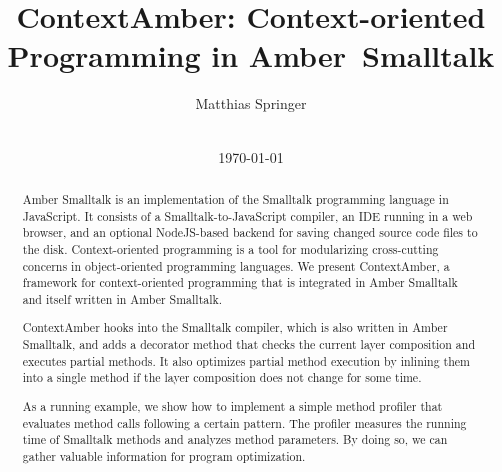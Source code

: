 \documentclass{sig-alternate}
\begin{document}
%

\title{ContextAmber: Context-oriented Programming in Amber~Smalltalk}

\author{
\alignauthor
Matthias Springer\\
       \\
}

\date{\today}

\maketitle
\begin{abstract}
Amber Smalltalk is an implementation of the Smalltalk programming language in JavaScript. It consists of a Smalltalk-to-JavaScript compiler, an IDE running in a web browser, and an optional NodeJS-based backend for saving changed source code files to the disk. Context-oriented programming is a tool for modularizing cross-cutting concerns in object-oriented programming languages. We present ContextAmber, a framework for context-oriented programming that is integrated in Amber Smalltalk and itself written in Amber Smalltalk.

ContextAmber hooks into the Smalltalk compiler, which is also written in Amber Smalltalk, and adds a decorator method that checks the current layer composition and executes partial methods. It also optimizes partial method execution by inlining them into a single method if the layer composition does not change for some time.

As a running example, we show how to implement a simple method profiler that evaluates method calls following a certain pattern. The profiler measures the running time of Smalltalk methods and analyzes method parameters. By doing so, we can gather valuable information for program optimization.
\end{abstract}
\end{document}
